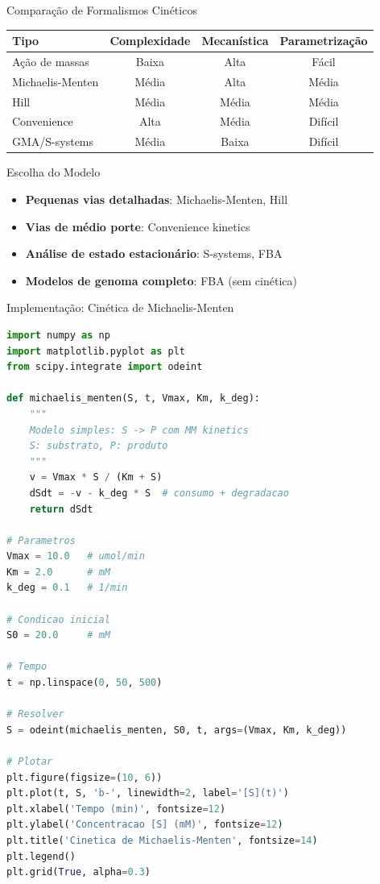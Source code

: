 \begin{frame}{Comparação de Formalismos Cinéticos}
\begin{center}
\begin{tabular}{lccc}
\toprule
\textbf{Tipo} & \textbf{Complexidade} & \textbf{Mecanística} & \textbf{Parametrização} \\
\midrule
Ação de massas & Baixa & Alta & Fácil \\
Michaelis-Menten & Média & Alta & Média \\
Hill & Média & Média & Média \\
Convenience & Alta & Média & Difícil \\
GMA/S-systems & Média & Baixa & Difícil \\
\bottomrule
\end{tabular}
\end{center}

\vspace{0.3cm}

\begin{exampleblock}{Escolha do Modelo}
\begin{itemize}
    \item \textbf{Pequenas vias detalhadas}: Michaelis-Menten, Hill
    \item \textbf{Vias de médio porte}: Convenience kinetics
    \item \textbf{Análise de estado estacionário}: S-systems, FBA
    \item \textbf{Modelos de genoma completo}: FBA (sem cinética)
\end{itemize}
\end{exampleblock}
\end{frame}

\begin{frame}[fragile]{Implementação: Cinética de Michaelis-Menten}
\begin{lstlisting}[language=Python, caption=Modelo cinético simples]
import numpy as np
import matplotlib.pyplot as plt
from scipy.integrate import odeint

def michaelis_menten(S, t, Vmax, Km, k_deg):
    """
    Modelo simples: S -> P com MM kinetics
    S: substrato, P: produto
    """
    v = Vmax * S / (Km + S)
    dSdt = -v - k_deg * S  # consumo + degradacao
    return dSdt

# Parametros
Vmax = 10.0   # umol/min
Km = 2.0      # mM
k_deg = 0.1   # 1/min

# Condicao inicial
S0 = 20.0     # mM

# Tempo
t = np.linspace(0, 50, 500)

# Resolver
S = odeint(michaelis_menten, S0, t, args=(Vmax, Km, k_deg))

# Plotar
plt.figure(figsize=(10, 6))
plt.plot(t, S, 'b-', linewidth=2, label='[S](t)')
plt.xlabel('Tempo (min)', fontsize=12)
plt.ylabel('Concentracao [S] (mM)', fontsize=12)
plt.title('Cinetica de Michaelis-Menten', fontsize=14)
plt.legend()
plt.grid(True, alpha=0.3)
\end{lstlisting}
\end{frame}

